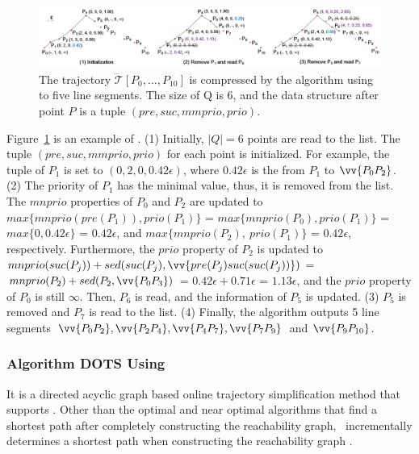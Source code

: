 \begin{figure}[tb!]
	\centering
	\includegraphics[scale=0.48]{Figures/Fig-Squishe.jpg}
	\vspace{-2ex}
	\caption{\small The trajectory $\dddot{\mathcal{T}}[P_0, \ldots, P_{10}]$ is compressed by the \squishe algorithm using \sed to five line segments. The size of Q is 6, and the data structure after point $P$ is a tuple $(pre, suc, mmprio, prio)$. }
	\vspace{-1ex}
	\label{fig:squishe}
\end{figure}



\begin{example}
	\label{exm-alg-squishe}
	Figure~\ref{fig:squishe} is an example of \squishe.
	(1) Initially, $|Q| = 6$ points are read to the list. The tuple $(pre, suc, mmprio, prio)$ for each point is initialized. For example, the tuple of $P_1$ is set to $(0, 2, 0, 0.42\epsilon)$, where $0.42\epsilon$ is the \sed from $P_1$ to $\vv{P_0P_2}$.
	(2) The priority of $P_1$ has the minimal value, thus, it is removed from the list.
	The $mnprio$ properties of $P_0$ and $P_2$ are updated to $max\{mnprio(pre(P_1)), prio(P_1)\}$ = $max\{mnprio(P_0), prio(P_1)\}$ = $max\{0, 0.42\epsilon\}$ = $0.42\epsilon$, and $max\{mnprio(P_2), ~prio(P_1)\}$ = $0.42\epsilon$, respectively.
	Furthermore, the $prio$ property of $P_2$ is updated to $mnprio(suc(P_j)) + sed(suc(P_j),\vv{pre(P_{j})suc(suc(P_{j}))})$ = $mnprio(P_2) + sed(P_2,\vv{P_0P_3})$ = $0.42\epsilon + 0.71\epsilon$ = $1.13\epsilon$, and the $prio$ property of $P_0$ is still $\infty$.
	Then, $P_6$ is read, and the information of $P_5$ is updated.
	(3) $P_5$ is removed and $P_7$ is read to the list.
	(4) {Finally, the algorithm outputs 5 line segments $\vv{P_0P_2},\vv{P_2P_4},\vv{P_4P_7},\vv{P_7P_9}$ and $\vv{P_9P_{10}}$}.
\end{example}

\subsubsection{{Algorithm DOTS Using \lissed~\cite{Cao:Dots}}}
{It is a directed acyclic graph based online trajectory simplification method that supports \lissed. Other than the optimal and near optimal algorithms \cite{Chen:Fast,Daescu:metric} that find a shortest path after completely constructing the reachability graph, \dagots~incrementally determines a shortest path when constructing the reachability graph \cite{Cao:Dots}.}


